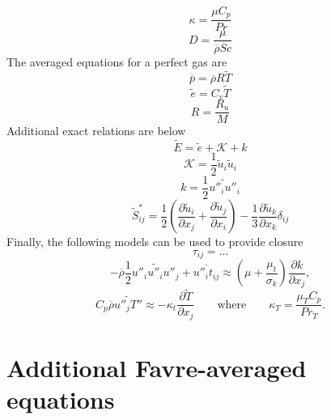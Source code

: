 \documentclass[oneside,a4paper,11pt]{report}
\newcommand{\rhoavg}{\overline{\rho}}
\newcommand{\pavg}{\overline{p}}
\newcommand{\rs}{\tau}          %
\newcommand{\eavgf}{\widetilde{e}}
\newcommand{\uavgf}{\widetilde{u}}
\newcommand{\Eavgf}{\widetilde{E}}
\newcommand{\Tavgf}{\widetilde{T}}
\newcommand{\Savgf}{\widetilde{S}}
\newcommand{\Tflucf}{T''}
\newcommand{\uflucf}{u''}
\begin{document}
\begin{equation}
    \kappa = \frac{\mu C_p}{Pr}
\end{equation}
\begin{equation}
    D = \frac{\mu}{\rhoavg Sc}
\end{equation}
The averaged equations for a perfect gas are
\begin{equation}
    \pavg = \rhoavg R \Tavgf
\end{equation}
\begin{equation}
    \eavgf = C_v \Tavgf
\end{equation}
\begin{equation}    
    R = \frac{R_u}{M}
\end{equation}
Additional exact relations are below
\begin{equation} 
    \Eavgf = \eavgf + \mathcal{K} + k 
\end{equation}
\begin{equation}    
    \mathcal{K} = \frac{1}{2} \uavgf_i \uavgf_i
\end{equation}
\begin{equation}    
    k = \frac{1}{2} \widetilde{\uflucf_i \uflucf_i}
\end{equation}
\begin{equation}
    \Savgf^*_{ij} = \frac{1}{2} \left ( \frac{\partial \uavgf_i}{\partial x_j} + \frac{\partial \uavgf_j}{\partial x_i} \right ) - \frac{1}{3} \frac{\partial \uavgf_k}{\partial x_k} \delta_{ij}
\end{equation}
Finally, the following models can be used to provide closure
\begin{equation}
    \rs_{ij} = ...
\end{equation}
\begin{equation}
- \rhoavg \frac{1}{2} \widetilde{ \uflucf_i \uflucf_i \uflucf_j} +  \overline{ \uflucf_i t_{ij} } \approx \left(\mu + \frac{\mu_t}{\sigma_k}\right)\frac{\partial k}{\partial x_j},
\end{equation}
\begin{equation}
C_p \rhoavg \widetilde{ \uflucf_j \Tflucf } \approx -\kappa_t \frac{\partial \Tavgf}{\partial x_j} \qquad \text{where} \qquad \kappa_T = \frac{\mu_T C_p}{Pr_T}.
\end{equation}

\section{Additional Favre-averaged equations}
\end{document}
